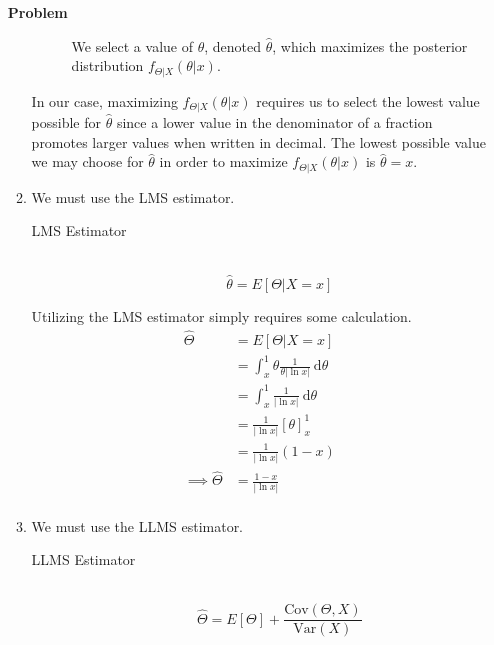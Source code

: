 \documentclass[12pt]{article}
\newenvironment{Ex}{\textbf{Problem}\vspace{.75em}\\}{}
\newcommand{\dd}[1]{\:\mathrm{d}{#1}}
\begin{document}
\begin{enumerate}
\begin{Ex}
\begin{solution}
\begin{enumerate}
\begin{mdframed}[backgroundcolor=silver]
\begin{description}
            We select a value of $\theta$, denoted $\hat{\theta}$,
            which maximizes the posterior distribution
            $f_{\Theta|X}(\theta|x)$.
          \end{description}
        \end{mdframed}
        In our case, maximizing $f_{\Theta|X}(\theta|x)$ requires us
        to select the lowest value possible for $\hat{\theta}$ since a
        lower value in the denominator of a fraction promotes larger
        values when written in decimal. The lowest possible value we
        may choose for $\hat{\theta}$ in order to maximize
        $f_{\Theta|X}(\theta|x)$ is $\hat{\theta}=x$.
      \item We must use the LMS estimator.
        \begin{mdframed}[backgroundcolor=silver]
          \begin{description}
          \item[LMS Estimator] \hfill \\
            $$\hat{\theta} = E[\Theta|X=x]$$
          \end{description}
        \end{mdframed}
        Utilizing the LMS estimator simply requires some calculation.
        \begin{equation}
          \label{eq:4c-sol}
          \begin{aligned}
            \hat{\Theta} &= E[\Theta|X=x] \\
            &= \int_x^1 \theta \frac{1}{\theta|\ln x|} \dd{\theta} \\
            &= \int_x^1 \frac{1}{|\ln x|} \dd{\theta} \\
            &= \frac{1}{|\ln x|} [\theta]_x^1 \\
            &= \frac{1}{|\ln x|} (1-x) \\
            \implies \hat{\Theta} &= \frac{1-x}{|\ln x|} \\
          \end{aligned}
        \end{equation}
      \item  We must use the LLMS estimator.
        \begin{mdframed}[backgroundcolor=silver]
          \begin{description}
          \item[LLMS Estimator] \hfill \\
            $$\hat{\Theta} = E[\Theta]+
            \frac{\text{Cov}(\Theta,X)}{\text{Var}(X)}
$$
\end{description}
\end{mdframed}
\end{enumerate}
\end{solution}
\end{Ex}
\end{enumerate}
\end{document}

